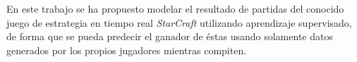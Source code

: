 





En este trabajo se ha propuesto modelar el resultado de partidas del conocido
juego de estrategia en tiempo real \emph{StarCraft} utilizando aprendizaje
supervisado, de forma que se pueda predecir el ganador de éstas usando
solamente datos generados por los propios jugadores mientras compiten.

